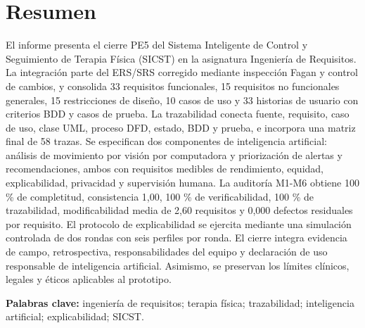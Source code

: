\documentclass[12pt,a4paper]{article}
\begin{document}
\section*{Resumen}
El informe presenta el cierre PE5 del Sistema Inteligente de Control y Seguimiento de Terapia Física (SICST) en la asignatura Ingeniería de Requisitos. La integración parte del ERS/SRS corregido mediante inspección Fagan y control de cambios, y consolida 33 requisitos funcionales, 15 requisitos no funcionales generales, 15 restricciones de diseño, 10 casos de uso y 33 historias de usuario con criterios BDD y casos de prueba. La trazabilidad conecta fuente, requisito, caso de uso, clase UML, proceso DFD, estado, BDD y prueba, e incorpora una matriz final de 58 trazas. Se especifican dos componentes de inteligencia artificial: análisis de movimiento por visión por computadora y priorización de alertas y recomendaciones, ambos con requisitos medibles de rendimiento, equidad, explicabilidad, privacidad y supervisión humana. La auditoría M1-M6 obtiene 100 \% de completitud, consistencia 1,00, 100 \% de verificabilidad, 100 \% de trazabilidad, modificabilidad media de 2,60 requisitos y 0,000 defectos residuales por requisito. El protocolo de explicabilidad se ejercita mediante una simulación controlada de dos rondas con seis perfiles por ronda. El cierre integra evidencia de campo, retrospectiva, responsabilidades del equipo y declaración de uso responsable de inteligencia artificial. Asimismo, se preservan los límites clínicos, legales y éticos aplicables al prototipo.

\textbf{Palabras clave:} ingeniería de requisitos; terapia física; trazabilidad; inteligencia artificial; explicabilidad; SICST.
\end{document}
